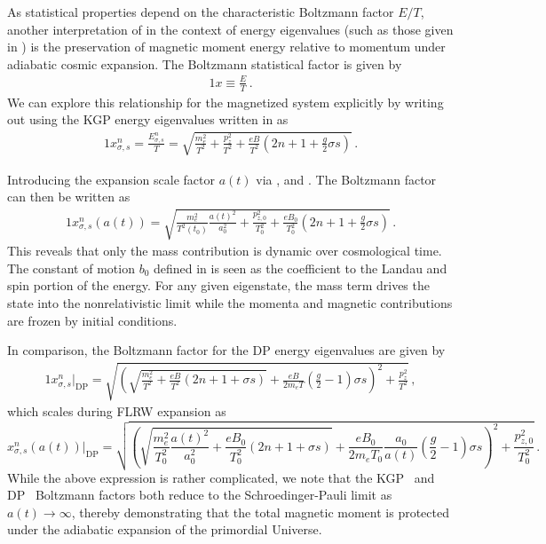 \label{sec:protection}
As statistical properties depend on the characteristic Boltzmann factor $E/T$, another interpretation of  in the context of energy eigenvalues (such as those given in ) is the preservation of magnetic moment energy relative to momentum under adiabatic cosmic expansion. The Boltzmann statistical factor is given by
\begin{alignat}{1}
 \label{Boltz} x\equiv\frac{E}{T}\,.
\end{alignat}
We can explore this relationship for the magnetized system explicitly by writing out  using the KGP energy eigenvalues written in  as
\begin{alignat}{1}
 \label{XExplicit} x_{\sigma,s}^{n} = \frac{E_{\sigma,s}^{n}}{T} = \sqrt{\frac{m_{e}^{2}}{T^{2}}+\frac{p_{z}^{2}}{T^{2}}+\frac{eB}{T^{2}}\left(2n+1+\frac{g}{2}\sigma s\right)}\,.
\end{alignat}

Introducing the expansion scale factor $a(t)$ via ,  and . The Boltzmann factor can then be written as
\begin{alignat}{1}
 \label{xscale:1} x_{\sigma,s}^{n}(a(t)) = \sqrt{\frac{m_{e}^{2}}{T^{2}(t_{0})}\frac{a(t)^{2}}{a_{0}^{2}}+\frac{p_{z,0}^{2}}{T_{0}^{2}}+\frac{eB_{0}}{T_{0}^{2}}\left(2n+1+\frac{g}{2}\sigma s\right)}\,.
\end{alignat}
This reveals that only the mass contribution is dynamic over cosmological time. The constant of motion $b_{0}$ defined in  is seen as the coefficient to the Landau and spin portion of the energy. For any given eigenstate, the mass term drives the state into the nonrelativistic limit while the momenta and magnetic contributions are frozen by initial conditions. 

In comparison, the Boltzmann factor for the DP energy eigenvalues are given by
\begin{alignat}{1}
 \label{xscaledp:1} x_{\sigma,s}^{n}\vert_\mathrm{DP} = \sqrt{\left(\sqrt{\frac{m_{e}^{2}}{T^{2}}+\frac{eB}{T^{2}}\left(2n+1+\sigma s\right)}+\frac{eB}{2m_{e}T}\left(\frac{g}{2}-1\right)\sigma s\right)^{2}+\frac{p_{z}^{2}}{T^{2}}}\,,
\end{alignat}
which scales during FLRW expansion as
\begin{equation}
 \label{xscaledp:2} x_{\sigma,s}^{n}(a(t))\vert_\mathrm{DP} =  \sqrt{\left(\sqrt{\frac{m_{e}^{2}}{T_{0}^{2}}\frac{a(t)^{2}}{a_{0}^{2}}+\frac{eB_{0}}{T_{0}^{2}}\left(2n+1+\sigma s\right)}+\frac{eB_{0}}{2m_{e}T_{0}}\frac{a_{0}}{a(t)}\left(\frac{g}{2}-1\right)\sigma s\right)^{2}+\frac{p_{z,0}^{2}}{T_{0}^{2}}}\,.
\end{equation}
While the above expression is rather complicated, we note that the KGP~ and DP~ Boltzmann factors both reduce to the Schroedinger-Pauli limit as $a(t)\rightarrow\infty$, thereby demonstrating that the total magnetic moment is protected under the adiabatic expansion of the primordial Universe.

